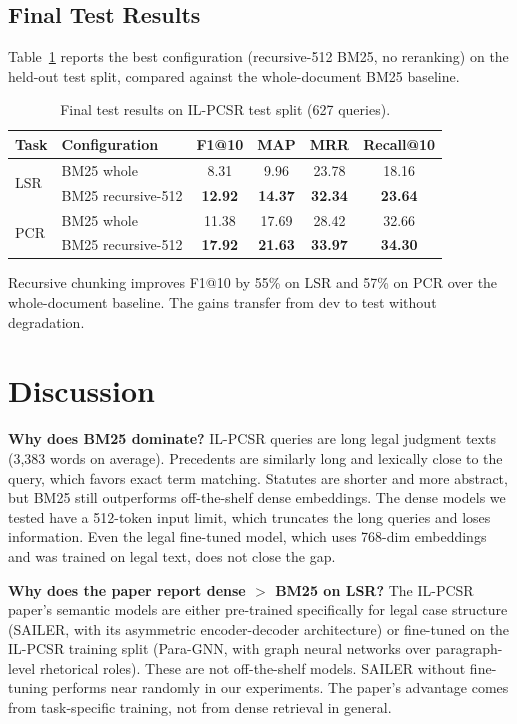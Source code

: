 \documentclass[11pt]{article}
\begin{document}
\subsection{Final Test Results}

Table~\ref{tab:test} reports the best configuration (recursive-512 BM25, no reranking) on the held-out test split, compared against the whole-document BM25 baseline.

\begin{table}[h]
\centering
\caption{Final test results on IL-PCSR test split (627 queries).}
\label{tab:test}
\begin{tabular}{llcccc}
\toprule
Task & Configuration & F1@10 & MAP & MRR & Recall@10 \\
\midrule
\multirow{2}{*}{LSR} & BM25 whole & 8.31 & 9.96 & 23.78 & 18.16 \\
 & BM25 recursive-512 & \textbf{12.92} & \textbf{14.37} & \textbf{32.34} & \textbf{23.64} \\
\midrule
\multirow{2}{*}{PCR} & BM25 whole & 11.38 & 17.69 & 28.42 & 32.66 \\
 & BM25 recursive-512 & \textbf{17.92} & \textbf{21.63} & \textbf{33.97} & \textbf{34.30} \\
\bottomrule
\end{tabular}
\end{table}

Recursive chunking improves F1@10 by 55\% on LSR and 57\% on PCR over the whole-document baseline. The gains transfer from dev to test without degradation.

\section{Discussion}

\textbf{Why does BM25 dominate?} IL-PCSR queries are long legal judgment texts (3{,}383 words on average). Precedents are similarly long and lexically close to the query, which favors exact term matching. Statutes are shorter and more abstract, but BM25 still outperforms off-the-shelf dense embeddings. The dense models we tested have a 512-token input limit, which truncates the long queries and loses information. Even the legal fine-tuned model, which uses 768-dim embeddings and was trained on legal text, does not close the gap.

\textbf{Why does the paper report dense $>$ BM25 on LSR?} The IL-PCSR paper's semantic models are either pre-trained specifically for legal case structure (SAILER, with its asymmetric encoder-decoder architecture) or fine-tuned on the IL-PCSR training split (Para-GNN, with graph neural networks over paragraph-level rhetorical roles). These are not off-the-shelf models. SAILER without fine-tuning performs near randomly in our experiments. The paper's advantage comes from task-specific training, not from dense retrieval in general.
\end{document}
